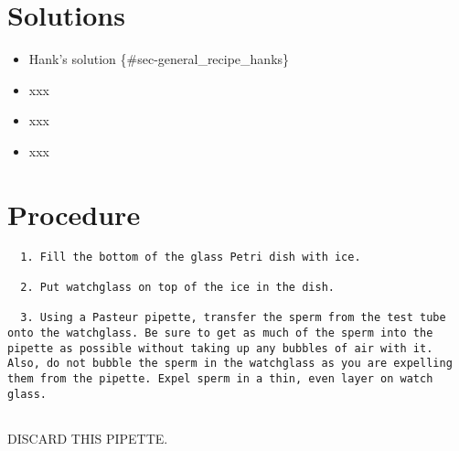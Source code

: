 \documentclass[
  letterpaper,
  DIV=11,
  numbers=noendperiod]{scrreprt}
\providecommand{\tightlist}{%
  \setlength{\itemsep}{0pt}\setlength{\parskip}{0pt}}\usepackage{longtable,booktabs,array}
\begin{document}
\hypertarget{solutions-76}{%
\section{Solutions}\label{solutions-76}}

\begin{itemize}
\tightlist
\item
  Hank's solution \{\#sec-general\_recipe\_hanks\}
\item
  xxx
\item
  xxx
\item
  xxx
\end{itemize}

\hypertarget{procedure-84}{%
\section{Procedure}\label{procedure-84}}

\begin{verbatim}
  1. Fill the bottom of the glass Petri dish with ice. 
  
  2. Put watchglass on top of the ice in the dish. 
  
  3. Using a Pasteur pipette, transfer the sperm from the test tube onto the watchglass. Be sure to get as much of the sperm into the pipette as possible without taking up any bubbles of air with it. Also, do not bubble the sperm in the watchglass as you are expelling them from the pipette. Expel sperm in a thin, even layer on watch glass.  
  
\end{verbatim}

\begin{tcolorbox}[enhanced jigsaw, toprule=.15mm, breakable, coltitle=black, leftrule=.75mm, title=\textcolor{quarto-callout-warning-color}{\faExclamationTriangle}\hspace{0.5em}{Warning}, bottomrule=.15mm, toptitle=1mm, bottomtitle=1mm, colframe=quarto-callout-warning-color-frame, opacityback=0, colback=white, opacitybacktitle=0.6, colbacktitle=quarto-callout-warning-color!10!white, rightrule=.15mm, titlerule=0mm, arc=.35mm, left=2mm]

DISCARD THIS PIPETTE.

\end{tcolorbox}
\end{document}
